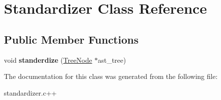 \hypertarget{classStandardizer}{
\section{Standardizer Class Reference}
\label{classStandardizer}
}
\subsection*{Public Member Functions}
\begin{DoxyCompactItemize}
\item 
\hypertarget{classStandardizer_a77273774dcf6da7cef36af92d7ea7a3c}{
void {\bfseries standerdize} (\hyperlink{classTreeNode}{TreeNode} $\ast$ast\_\-tree)}
\label{classStandardizer_a77273774dcf6da7cef36af92d7ea7a3c}

\end{DoxyCompactItemize}


The documentation for this class was generated from the following file:\begin{DoxyCompactItemize}
\item 
standardizer.c++\end{DoxyCompactItemize}
